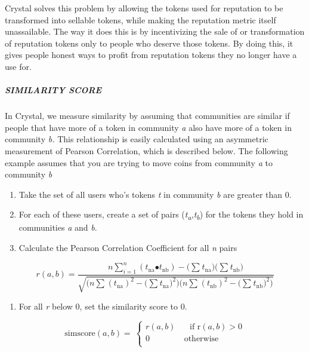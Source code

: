 Crystal solves this problem by allowing the tokens used for reputation
to be transformed into sellable tokens, while making the reputation
metric itself unassailable. The way it does this is by incentivizing the
sale of or transformation of reputation tokens only to people who
deserve those tokens. By doing this, it gives people honest ways to
profit from reputation tokens they no longer have a use for.

\subparagraph{SIMILARITY SCORE}\label{similarity-score}

In Crystal, we measure similarity by assuming that communities are
similar if people that have more of a token in community \emph{a} also
have more of a token in community \emph{b.} This relationship is easily
calculated using an asymmetric measurement of Pearson Correlation, which
is described below. The following example assumes that you are trying to
move coins from community \emph{a} to community \emph{b}

\begin{enumerate}
\def\labelenumi{\arabic{enumi}.}
\item
  Take the set of all users who's tokens \emph{t} in community \emph{b}
  are greater than 0.
\item
  For each of these users, create a set of pairs
  (\emph{t\textsubscript{a},t\textsubscript{b}}) for the tokens they
  hold in communities \emph{a} and \emph{b}.
\item
  Calculate the Pearson Correlation Coefficient for all \emph{n} pairs
\end{enumerate}

\[r(a,b) = \frac{n\sum_{i = 1}^{n}{\left( t_{\text{na}}{\bullet t}_{\text{nb}} \right) - (\sum_{}^{}{t_{\text{na}})(\sum_{}^{}{t_{\text{nb}})}}}}{\sqrt{(n\sum_{}^{}{\left( t_{\text{na}} \right)^{2} - {(\sum_{}^{}{t_{\text{na}})}}^{2})(n\sum_{}^{}{\left( t_{\text{nb}} \right)^{2} - {(\sum_{}^{}{t_{\text{nb}})}}^{2})}}}}\]

\begin{enumerate}
\def\labelenumi{\arabic{enumi}.}
\item
  For all \emph{r} below 0, set the similarity score to 0.
\end{enumerate}

\[\text{simscore}\left( a,b \right) = \ \left\{ \begin{matrix}
r(a,b) \\
0 \\
\end{matrix} \right.\ \begin{matrix}
\text{\ \ \ \ \ }\text{if\ r}\left( a,b \right) > 0 \\
\text{otherwise} \\
\end{matrix}\]

